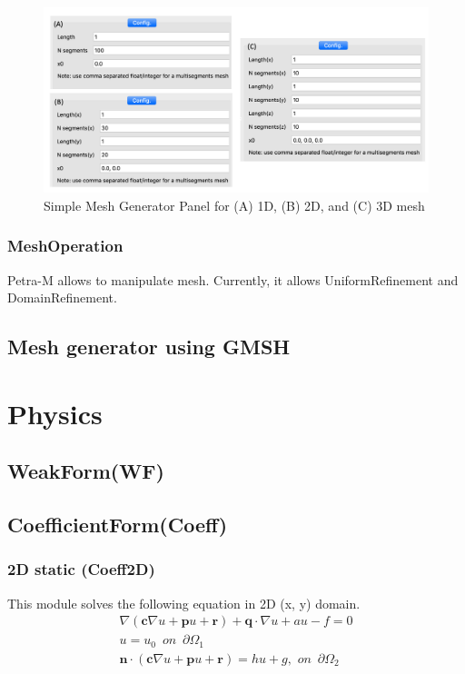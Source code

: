 \documentclass[11pt,a4paper,final]{report}
\begin{document}
\begin{figure}
\centering
\includegraphics[width=0.95\columnwidth]{figures/simple_mesh_gui.png} 
\caption{ Simple Mesh Generator Panel for (A) 1D, (B) 2D, and (C) 3D mesh }\label{simple_mesh}
\end{figure}

\subsection{MeshOperation}
Petra-M allows to manipulate mesh. Currently, it allows UniformRefinement and DomainRefinement. 

\section{Mesh generator using GMSH}
\label{GMSH_Mesh}

\chapter{Physics}
\section{WeakForm(WF)}
\section{CoefficientForm(Coeff)}
\subsection{2D static (Coeff2D)}
This module solves the following equation in 2D (x, y) domain.
  \begin{align}
   \nabla (\mathbf{c} \nabla u + \mathbf{p}u + \mathbf{r}) + \mathbf{q} \cdot \nabla u + au - f = 0 
  \\  
  u = u_{0} \,\,\,on\,\,\,\partial \Omega_{1}
  \\
 \mathbf{n}\cdot (\mathbf{c} \nabla u + \mathbf{p}u + \mathbf{r}) = hu + g,\,\,on\,\,\,\partial \Omega_{2}
  \end{align}
  
\end{document}
